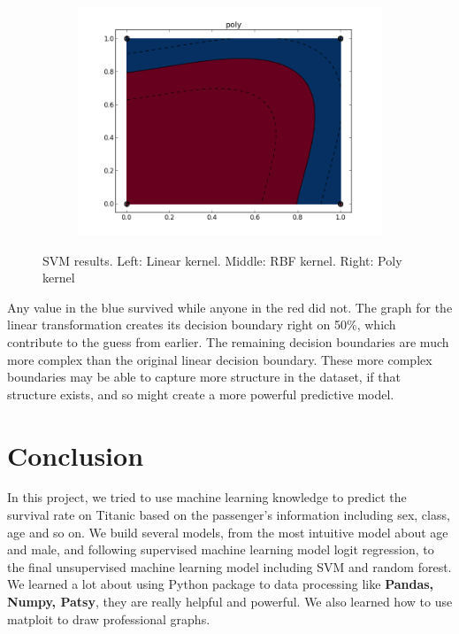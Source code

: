 \documentclass{article}
\begin{document}
\begin{figure}
\begin{subfigure}[b]{0.3\textwidth}
		\hspace*{0.7in}
		\includegraphics[width=2\textwidth]{eps/test_SVM_poly.png}
		\label {fig:pre}
	\end{subfigure}
	\caption{SVM results. Left: Linear kernel. Middle: RBF kernel. Right: Poly kernel}
	\label{fig:svm}

\end{figure}


	




Any value in the blue survived while anyone in the red did not. The graph for the linear transformation creates its decision boundary right on 50\%, which contribute to the guess from earlier. The remaining decision boundaries are much more complex than the original linear decision boundary. These more complex boundaries may be able to capture more structure in the dataset, if that structure exists, and so might create a more powerful predictive model.\\






\section{Conclusion}

In this project, we tried to use machine learning knowledge to predict the survival rate on Titanic based on the passenger's information including sex, class, age and so on. We build several models, from the most intuitive model about age and male, and following supervised machine learning model logit regression, to the final unsupervised machine learning model including SVM and random forest. We learned a lot about using Python package to data processing like \textbf{Pandas, Numpy, Patsy}, they are really helpful and powerful. We also learned how to use matploit to draw professional graphs. 
\end{document}
